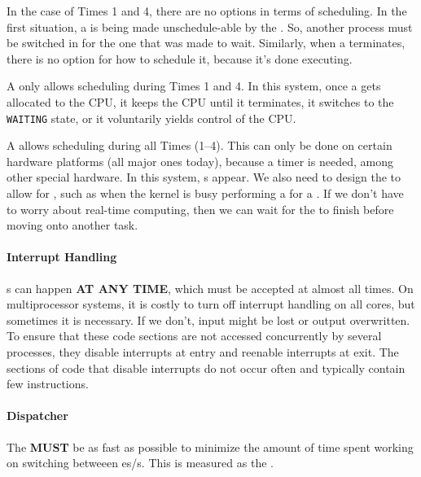 In the case of Times 1 and 4, there are no options in terms of scheduling.
In the first situation, a  is being made unschedule-able by the .
So, another process must be switched in for the one that was made to wait.
Similarly, when a  terminates, there is no option for how to schedule it, because it's done executing.

A  only allows scheduling during Times 1 and 4.
In this system, once a  gets allocated to the CPU, it keeps the CPU until it terminates, it switches to the \texttt{WAITING} state, or it voluntarily yields control of the CPU.

A  allows scheduling during all Times (1--4).
This can only be done on certain hardware platforms (all major ones today), because a timer is needed, among other special hardware.
In this system, s appear.
We also need to design the  to allow for , such as when the kernel is busy performing a  for a .
If we don't have to worry about real-time computing, then we can wait for the  to finish before moving onto another task.

\paragraph{Interrupt Handling}\label{par:Interrupt_Handling}
s can happen \textbf{AT ANY TIME}, which must be accepted at almost all times.
On multiprocessor systems, it is costly to turn off interrupt handling on all cores, but sometimes it is necessary.
If we don't, input might be lost or output overwritten.
To ensure that these code sections are not accessed concurrently by several processes, they disable interrupts at entry and reenable interrupts at exit.
The sections of code that disable interrupts do not occur often and typically contain few instructions.

\paragraph{Dispatcher}\label{par:Dispatcher}
The  \textbf{MUST} be as fast as possible to minimize the amount of time spent working on switching betweeen es/s.
This is measured as the .


